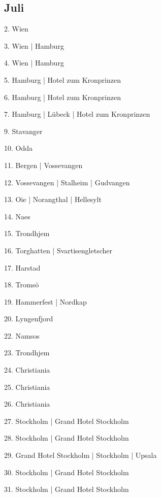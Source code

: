 \documentclass[twoside=false,titlepage=false,open=any, parskip=never, fontsize=10pt, headings=small, chapterprefix=false, appendixprefix=false, DIV=15]{scrbook}
\begin{document}
\begin{multicols}{3}
            \section*{Juli}
            2. Wien\par
            3. Wien | Hamburg\par
            4. Wien | Hamburg\par
            5. Hamburg | Hotel zum Kronprinzen\par
            6. Hamburg | Hotel zum Kronprinzen\par
            7. Hamburg | Lübeck | Hotel zum Kronprinzen\par
            9. Stavanger\par
            10. Odda\par
            11. Bergen | Vossevangen\par
            12. Vossevangen | Stalheim | Gudvangen\par
            13. Oie | Norangthal | Hellesylt\par
            14. Naes\par
            15. Trondhjem\par
            16. Torghatten | Svartisengletscher\par
            17. Harstad\par
            18. Tromsö\par
            19. Hammerfest | Nordkap\par
            20. Lyngenfjord\par
            22. Namsos\par
            23. Trondhjem\par
            24. Christiania\par
            25. Christiania\par
            26. Christiania\par
            27. Stockholm | Grand Hotel Stockholm\par
            28. Stockholm | Grand Hotel Stockholm\par
            29. Grand Hotel Stockholm | Stockholm | Upsala\par
            30. Stockholm | Grand Hotel Stockholm\par
            31. Stockholm | Grand Hotel Stockholm\par

\end{multicols}
\end{document}
